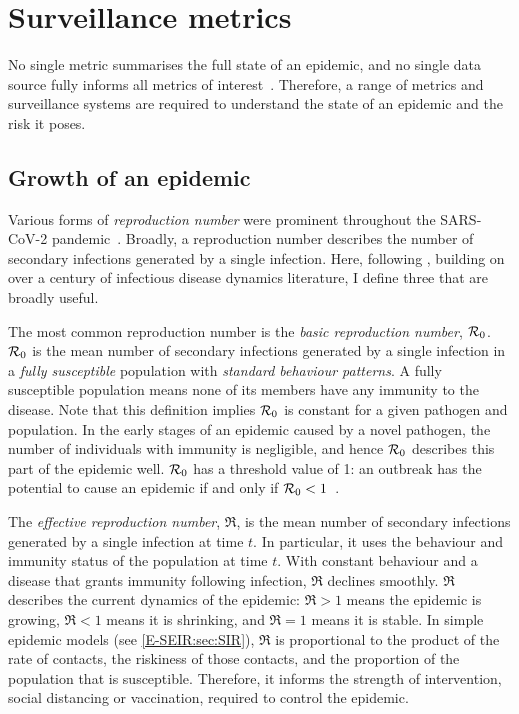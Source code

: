 \documentclass[thesis.tex]{subfiles}
\begin{document}
\section{Surveillance metrics} \label{intro:sec:metrics}

No single metric summarises the full state of an epidemic, and no single data source fully informs all metrics of interest~\autocite{royalSocietyRnumber,pellisEstimation,paragGrowthRates}.
Therefore, a range of metrics and surveillance systems are required to understand the state of an epidemic and the risk it poses.

\subsection{Growth of an epidemic}

Various forms of \emph{reproduction number} were prominent throughout the SARS-CoV-2 pandemic~\autocite{pellisEstimation}.
Broadly, a reproduction number describes the number of secondary infections generated by a single infection.
Here, following \textcite{pellisEstimation},  building on over a century of infectious disease dynamics literature, I define three that are broadly useful.

The most common reproduction number is the \emph{basic reproduction number}, $\mathcal{R}_{0}$.
$\mathcal{R}_{0}$ is the mean number of secondary infections generated by a single infection in a \emph{fully susceptible} population with \emph{standard behaviour patterns}.
A fully susceptible population means none of its members have any immunity to the disease.
Note that this definition implies $\mathcal{R}_{0}$ is constant for a given pathogen and population.
In the early stages of an epidemic caused by a novel pathogen, the number of individuals with immunity is negligible, and hence $\mathcal{R}_{0}$ describes this part of the epidemic well.
$\mathcal{R}_{0}$ has a threshold value of 1: an outbreak has the potential to cause an epidemic if and only if $\mathcal{R}_{0} < 1$~\autocite[76]{diekmannMathematical}.

The \emph{effective reproduction number}, $\Re$, is the mean number of secondary infections generated by a single infection at time $t$.
In particular, it uses the behaviour and immunity status of the population at time $t$.
With constant behaviour and a disease that grants immunity following infection, $\Re$ declines smoothly.
$\Re$ describes the current dynamics of the epidemic: $\Re > 1$ means the epidemic is growing, $\Re < 1$ means it is shrinking, and $\Re = 1$ means it is stable.
In simple epidemic models (see \cref{E-SEIR:sec:SIR}), $\Re$ is proportional to the product of the rate of contacts, the riskiness of those contacts, and the proportion of the population that is susceptible.
Therefore, it informs the strength of intervention, \eg social distancing or vaccination, required to control the epidemic.
\end{document}
